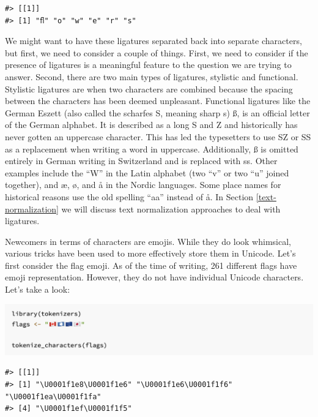 \documentclass[
]{krantz}
\begin{document}
\begin{verbatim}
#> [[1]]
#> [1] "ﬂ" "o" "w" "e" "r" "s"
\end{verbatim}

We might want to have these ligatures separated back into separate characters, but first, we need to consider a couple of things. First, we need to consider if the presence of ligatures is a meaningful feature to the question we are trying to answer. Second, there are two main types of ligatures, stylistic and functional. Stylistic ligatures are when two characters are combined because the spacing between the characters has been deemed unpleasant. Functional ligatures like the German Eszett (also called the scharfes S, meaning sharp s) ß, is an official letter of the German alphabet. It is described as a long S and Z and historically has never gotten an uppercase character. This has led the typesetters to use SZ or SS as a replacement when writing a word in uppercase. Additionally, ß is omitted entirely in German writing in Switzerland and is replaced with ss. Other examples include the ``W'' in the Latin alphabet (two ``v'' or two ``u'' joined together), and æ, ø, and å in the Nordic languages. Some place names for historical reasons use the old spelling ``aa'' instead of å. In Section \ref{text-normalization} we will discuss text normalization approaches to deal with ligatures.

Newcomers in terms of characters are emojis. While they do look whimsical, various tricks have been used to more effectively store them in Unicode. Let's first consider the flag emoji. As of the time of writing, 261 different flags have emoji representation. However, they do not have individual Unicode characters. Let's take a look:

\begin{center}\includegraphics[width=1\linewidth]{images/tokenization-emoji} \end{center}

\begin{verbatim}
#> [[1]]
#> [1] "\U0001f1e8\U0001f1e6" "\U0001f1e6\U0001f1f6" "\U0001f1ea\U0001f1fa"
#> [4] "\U0001f1ef\U0001f1f5"
\end{verbatim}
\end{document}
